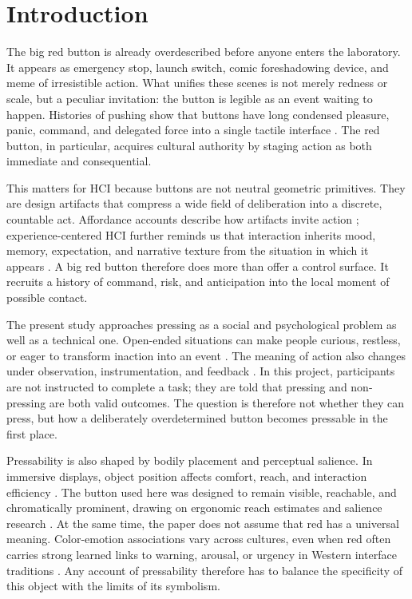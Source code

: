\section{Introduction}

The big red button is already overdescribed before anyone enters the laboratory. It appears as emergency stop, launch switch, comic foreshadowing device, and meme of irresistible action. What unifies these scenes is not merely redness or scale, but a peculiar invitation: the button is legible as an event waiting to happen. Histories of pushing show that buttons have long condensed pleasure, panic, command, and delegated force into a single tactile interface \citep{Plotnick2018,PlotnickInterface2012,PlotnickWarfare2012}. The red button, in particular, acquires cultural authority by staging action as both immediate and consequential.

This matters for HCI because buttons are not neutral geometric primitives. They are design artifacts that compress a wide field of deliberation into a discrete, countable act. Affordance accounts describe how artifacts invite action \citep{Gaver1991,Norman1999}; experience-centered HCI further reminds us that interaction inherits mood, memory, expectation, and narrative texture from the situation in which it appears \citep{McCarthyWright2004}. A big red button therefore does more than offer a control surface. It recruits a history of command, risk, and anticipation into the local moment of possible contact.

The present study approaches pressing as a social and psychological problem as well as a technical one. Open-ended situations can make people curious, restless, or eager to transform inaction into an event \citep{Wilson2014,KiddHayden2015}. The meaning of action also changes under observation, instrumentation, and feedback \citep{HallHenningsen2008,HaggardChambon2012}. In this project, participants are not instructed to complete a task; they are told that pressing and non-pressing are both valid outcomes. The question is therefore not whether they can press, but how a deliberately overdetermined button becomes pressable in the first place.

Pressability is also shaped by bodily placement and perceptual salience. In immersive displays, object position affects comfort, reach, and interaction efficiency \citep{Lin2021,Mirbagheri2024,Alghofaili2019,McNamara2019}. The button used here was designed to remain visible, reachable, and chromatically prominent, drawing on ergonomic reach estimates and salience research \citep{Bonin2022,Li2008,CastellottiEtAl2022}. At the same time, the paper does not assume that red has a universal meaning. Color-emotion associations vary across cultures, even when red often carries strong learned links to warning, arousal, or urgency in Western interface traditions \citep{ElliotMaier2014,GaoEtAl2007}. Any account of pressability therefore has to balance the specificity of this object with the limits of its symbolism.

